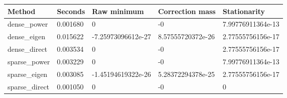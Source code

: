\begin{tabular}{lllll}
\hline
Method & Seconds & Raw minimum & Correction mass & Stationarity \\
\hline
dense\_power & 0.001680 & 0 & -0 & 7.99776911364e-13 \\
dense\_eigen & 0.015622 & -7.25973096612e-27 & 8.57555720372e-26 & 2.77555756156e-17 \\
dense\_direct & 0.003534 & 0 & -0 & 2.77555756156e-17 \\
sparse\_power & 0.003229 & 0 & -0 & 7.99776911364e-13 \\
sparse\_eigen & 0.003085 & -1.45194619322e-26 & 5.28372294378e-25 & 2.77555756156e-17 \\
sparse\_direct & 0.001050 & 0 & -0 & 0 \\
\hline
\end{tabular}
